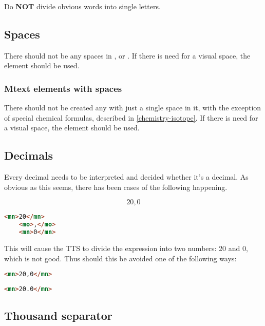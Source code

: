 \documentclass[english,a4paper,11pt]{article}
\begin{document}
Do \textbf{NOT} divide obvious words into single letters.

\subsection{Spaces}

There should not be any spaces in ,  or . If there is need for a visual space, the element  should be used.

\subsubsection{Mtext elements with spaces}

There should not be created any  with just a single space in it, with the exception of special chemical formulas, described in \ref{chemistry-isotope}. If there is need for a visual space, the element  should be used.

\subsection{Decimals}

Every decimal needs to be interpreted and decided whether it's a decimal. As obvious as this seems, there has been cases of the following happening.

\begin{eksempler}
\begin{equation}
	20,0
\end{equation}
\begin{lstlisting}[language=HTML, caption={\textbf{Invalid markup}}]
	<mn>20</mn>
	<mo>,</mo>
	<mn>0</mn>
\end{lstlisting}

This will cause the TTS to divide the expression into two numbers: 20 and 0, which is not good. Thus should this be avoided one of the following ways:
\begin{lstlisting}[language=HTML, caption={Valid markup 1}]
	<mn>20,0</mn>
\end{lstlisting}
\begin{lstlisting}[language=HTML, caption={Valid markup 2}]
	<mn>20.0</mn>
\end{lstlisting}
\end{eksempler}

\subsection{Thousand separator}
\end{document}
